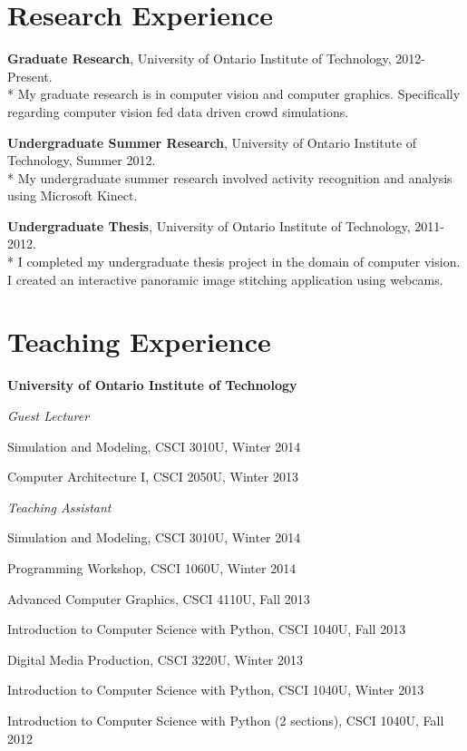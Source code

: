 \documentclass[letterpaper]{article}
\renewenvironment{itemize}{
  \begin{list}{}{
    \setlength{\leftmargin}{1.5em}
  }
}{
  \end{list}
}
\begin{document}
\section*{Research Experience}
\begin{itemize}
\item \textbf{Graduate Research}, University of Ontario Institute of Technology, 2012-Present. \\*
	My graduate research is in computer vision and computer graphics.  Specifically regarding computer vision fed data driven crowd simulations.
\item \textbf{Undergraduate Summer Research}, University of Ontario Institute of Technology,  Summer 2012.  \\*
	My undergraduate summer research involved activity recognition and analysis using Microsoft Kinect.
\item \textbf{Undergraduate Thesis}, University of Ontario Institute of Technology, 2011-2012. \\*
	I completed my undergraduate thesis project in the domain of computer vision.  I created an interactive panoramic image stitching application using webcams.
\end{itemize}


\section*{Teaching Experience}
\begin{itemize}
\item\textbf{University of Ontario Institute of Technology}
\item\textit{Guest Lecturer}
	\begin{itemize}
	\item Simulation and Modeling, CSCI 3010U, Winter 2014
 	\item Computer Architecture I, CSCI 2050U, Winter 2013
	\end{itemize}
\item\textit{Teaching Assistant}
	\begin{itemize}
	\item Simulation and Modeling, CSCI 3010U, Winter 2014
	\item Programming Workshop, CSCI 1060U, Winter 2014
	\item Advanced Computer Graphics, CSCI 4110U, Fall 2013
	\item Introduction to Computer Science with Python, CSCI 1040U, Fall 2013
	\item Digital Media Production, CSCI 3220U, Winter 2013
	\item Introduction to Computer Science with Python, CSCI 1040U, Winter 2013
	\item Introduction to Computer Science with Python (2 sections), CSCI 1040U, Fall 2012
	\end{itemize}
\end{itemize}
\end{document}

